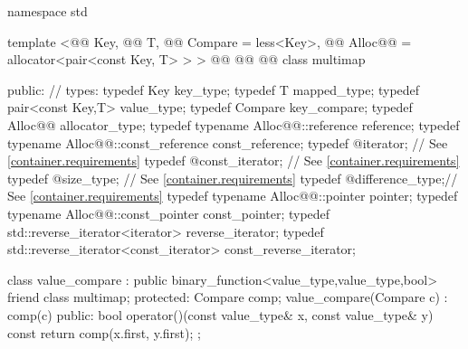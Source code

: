 \documentclass[american,twoside]{book}
\begin{document}
\begin{codeblock}
namespace std {
  template <@@ Key, @@ T, 
            @@ Compare = less<Key>,
            @@ Alloc@@ = allocator<pair<const Key, T> > >
    @@
           @@
           @@
  class multimap {
  public:
    // types:
    typedef Key                                   key_type;
    typedef T                                     mapped_type;
    typedef pair<const Key,T>                     value_type;
    typedef Compare                               key_compare;
    typedef Alloc@@                             allocator_type;
    typedef typename Alloc@@::reference         reference;
    typedef typename Alloc@@::const_reference   const_reference;
    typedef @\impdef@                iterator;       // See \ref{container.requirements}
    typedef @\impdef@                const_iterator; // See \ref{container.requirements}
    typedef @\impdef@                size_type;      // See \ref{container.requirements}
    typedef @\impdef@                difference_type;// See \ref{container.requirements}
    typedef typename Alloc@@::pointer           pointer;
    typedef typename Alloc@@::const_pointer     const_pointer;
    typedef std::reverse_iterator<iterator>       reverse_iterator;
    typedef std::reverse_iterator<const_iterator> const_reverse_iterator;

    class value_compare
      : public binary_function<value_type,value_type,bool> {
    friend class multimap;
    protected:
      Compare comp;
      value_compare(Compare c) : comp(c) { }
    public:
      bool operator()(const value_type& x, const value_type& y) const {
        return comp(x.first, y.first);
      }
    };

}}
\end{codeblock}
\end{document}
